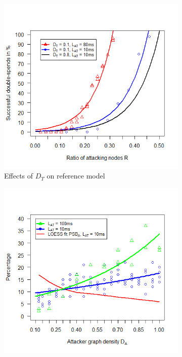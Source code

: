 \documentclass[a4paper,12pt,twoside]{report}
\begin{document}
\begin{figure}[!ht]
\begin{subfigure}{.5\textwidth}
  \includegraphics[width=\linewidth]{Experiments/TruDensity/trudensrat.png}
  \caption{Effects of $D_{T}$ on reference model}
  \label{trudens:b}
\end{subfigure}
\begin{subfigure}{.5\textwidth}
  \centering
  \includegraphics[width=\linewidth]{Experiments/AttDensity/attdens.png}

\end{subfigure}
\end{figure}
\end{document}
